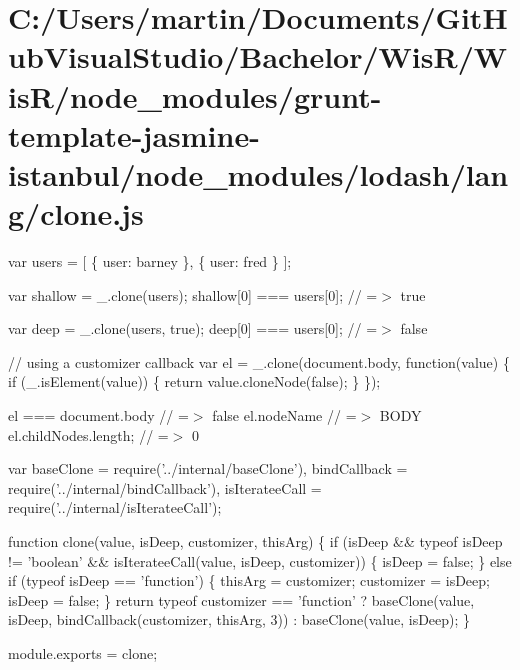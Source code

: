 \hypertarget{_c_1_2_users_2martin_2_documents_2_git_hub_visual_studio_2_bachelor_2_wis_r_2_wis_r_2node_moduleeb1fe6fa6c6d2ecefd67488f4d6bb3ed}{}\section{C\+:/\+Users/martin/\+Documents/\+Git\+Hub\+Visual\+Studio/\+Bachelor/\+Wis\+R/\+Wis\+R/node\+\_\+modules/grunt-\/template-\/jasmine-\/istanbul/node\+\_\+modules/lodash/lang/clone.\+js}
var users = \mbox{[} \{ \textquotesingle{}user\textquotesingle{}\+: \textquotesingle{}barney\textquotesingle{} \}, \{ \textquotesingle{}user\textquotesingle{}\+: \textquotesingle{}fred\textquotesingle{} \} \mbox{]};

var shallow = \+\_\+.\+clone(users); shallow\mbox{[}0\mbox{]} === users\mbox{[}0\mbox{]}; // =$>$ true

var deep = \+\_\+.\+clone(users, true); deep\mbox{[}0\mbox{]} === users\mbox{[}0\mbox{]}; // =$>$ false

// using a customizer callback var el = \+\_\+.\+clone(document.\+body, function(value) \{ if (\+\_\+.\+is\+Element(value)) \{ return value.\+clone\+Node(false); \} \});

el === document.\+body // =$>$ false el.\+node\+Name // =$>$ B\+O\+D\+Y el.\+child\+Nodes.\+length; // =$>$ 0


\begin{DoxyCodeInclude}
var baseClone = require(\textcolor{stringliteral}{'../internal/baseClone'}),
    bindCallback = require(\textcolor{stringliteral}{'../internal/bindCallback'}),
    isIterateeCall = require(\textcolor{stringliteral}{'../internal/isIterateeCall'});

\textcolor{keyword}{function} clone(value, isDeep, customizer, thisArg) \{
  \textcolor{keywordflow}{if} (isDeep && typeof isDeep != \textcolor{stringliteral}{'boolean'} && isIterateeCall(value, isDeep, customizer)) \{
    isDeep = \textcolor{keyword}{false};
  \}
  \textcolor{keywordflow}{else} \textcolor{keywordflow}{if} (typeof isDeep == \textcolor{stringliteral}{'function'}) \{
    thisArg = customizer;
    customizer = isDeep;
    isDeep = \textcolor{keyword}{false};
  \}
  \textcolor{keywordflow}{return} typeof customizer == \textcolor{stringliteral}{'function'}
    ? baseClone(value, isDeep, bindCallback(customizer, thisArg, 3))
    : baseClone(value, isDeep);
\}

module.exports = clone;
\end{DoxyCodeInclude}
 